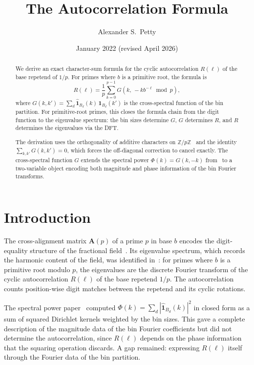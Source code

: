 \documentclass[12pt]{amsart}
\title{The Autocorrelation Formula}
\author{Alexander S.\ Petty}
\date{January 2022 (revised April 2026)}
\theoremstyle{definition}
\theoremstyle{remark}
\begin{document}
\begin{abstract}
We derive an exact character-sum formula for the cyclic
autocorrelation $R(\ell)$ of the base repetend of $1/p$. For
primes where $b$ is a primitive root, the formula is
\[
R(\ell) = \frac{1}{p}
\sum_{k=0}^{p-1}
G(k,\, -k b^{-\ell} \bmod p),
\]
where $G(k,k') = \sum_{d} \widehat{\mathbf{1}}_{B_d}(k)\,
\widehat{\mathbf{1}}_{B_d}(k')$ is the cross-spectral function
of the bin partition. For primitive-root primes, this closes the formula chain
from the digit function to the eigenvalue spectrum: the
bin sizes determine $G$, $G$ determines $R$, and $R$
determines the eigenvalues via the DFT.

The derivation uses the orthogonality of additive characters on
$\mathbb{Z}/p\mathbb{Z}$~\cite{iwaniec,hardy} and the identity
$\sum_{k,k'} G(k,k') = 0$, which forces the off-diagonal
correction to cancel exactly. The cross-spectral function $G$
extends the spectral power $\Phi(k) = G(k,-k)$
from~\cite{paper8} to a two-variable object encoding both
magnitude and phase information of the bin Fourier transforms.
\end{abstract}
\maketitle

\section{Introduction}

The cross-alignment matrix $\mathbf{A}(p)$ of a prime $p$
in base $b$ encodes the digit-equality structure of the
fractional field~\cite{paper6}. Its eigenvalue spectrum,
which records the harmonic content of the field, was
identified in~\cite{paper7}: for primes where $b$ is a
primitive root modulo $p$, the eigenvalues are the
discrete Fourier transform of the cyclic autocorrelation
$R(\ell)$ of the base repetend $1/p$. The autocorrelation
counts position-wise digit matches between the repetend
and its cyclic rotations.

The spectral power paper~\cite{paper8} computed
$\Phi(k) = \sum_d |\widehat{\mathbf{1}}_{B_d}(k)|^2$ in
closed form as a sum of squared Dirichlet kernels weighted
by the bin sizes. This gave a complete description of the
magnitude data of the bin Fourier coefficients but did not
determine the autocorrelation, since $R(\ell)$ depends on
the phase information that the squaring operation discards.
A gap remained: expressing $R(\ell)$ itself through the
Fourier data of the bin partition.
\end{document}
